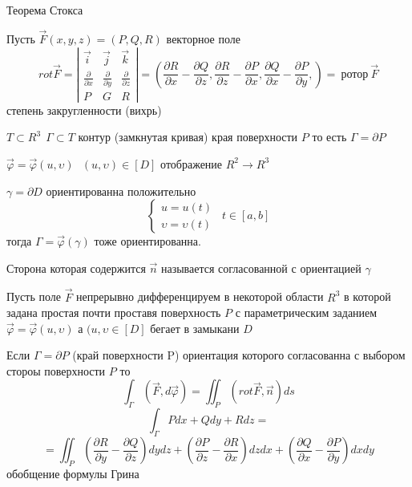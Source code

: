 \begin{title}[\Large]
  Теорема Стокса
\end{title}

\begin{theorem}[Стокса]
  Пусть $\vec F(x,y,z) = (P,Q,R)$ векторное поле
  $$
  rot \vec F =
  \left|
  \begin{array}{ccc}
    \vec i & \vec j & \vec k \\
    \frac{\partial}{\partial x} &
    \frac{\partial}{\partial y} &
    \frac{\partial}{\partial z} \\
    P & G & R
  \end{array}
  \right| =
  \left(
    \frac{\partial R}{\partial x}
    -
    \frac{\partial Q}{\partial z},
    \frac{\partial R}{\partial z}
    -
    \frac{\partial P}{\partial x},
    \frac{\partial Q}{\partial x}
    -
    \frac{\partial P}{\partial y},
  \right) = ~ \text{ротор} ~ \vec F
  $$
  степень закругленности (вихрь)

  $T \subset R^3 ~~ \Gamma \subset T$ контур (замкнутая кривая) края
  поверхности $P$ то есть $\Gamma = \partial P$

  $\vec \varphi = \vec \varphi(u, \upsilon) ~~~ (u, \upsilon) \in [D]$
  отображение $R^2 \to R^3$

  $\gamma = \partial D$ ориентированна положительно
  $$
  \left\{
  \begin{array}{l}
    u = u(t) \\
    \upsilon = \upsilon(t)
  \end{array}
  \right. ~~ t \in [a,b]
  $$
  тогда $\Gamma = \vec \varphi(\gamma)$ тоже ориентированна.

  Сторона которая содержится $\vec n$ называется согласованной с ориентацией
  $\gamma$
\end{theorem}

\begin{theorem}
  Пусть поле $\vec F$ непрерывно дифференцируем в некоторой области $R^3$ в
  которой задана простая почти проставя поверхность $P$ с параметрическим
  заданием $\vec \varphi = \vec \varphi(u, \upsilon)$ а $(u, \upsilon \in [D]$
  бегает в замыкани $D$

  Если $\Gamma = \partial P$ (край поверхности P) ориентация которого
  согласованна с выбором стороы поверхности $P$ то
  $$
  \int_{\Gamma} (\vec F, d\vec \varphi) = \iint_P (rot \vec F, \vec n) ds
  $$
  $$
  \int_{\Gamma} Pdx + Qdy + Rdz =
  $$
  $$
  = \iint_P
  \left(
    \frac{\partial R}{\partial y}
    -
    \frac{\partial Q}{\partial z}
  \right) dy dz
  +
  \left(
    \frac{\partial P}{\partial z}
    -
    \frac{\partial R}{\partial x}
  \right) dz dx
  +
  \left(
    \frac{\partial Q}{\partial x}
    -
    \frac{\partial P}{\partial y}
  \right) dx dy
  $$
  обобщение формулы Грина
\end{theorem}


